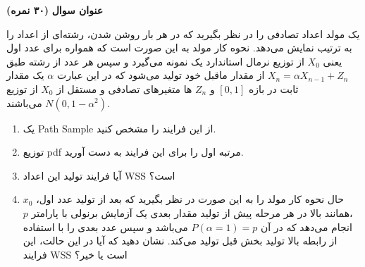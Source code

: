 \Large \textbf{عنوان سوال}
\large \textbf{(۳۰ نمره)}

\normalsize \vspace{0.5cm}

یک مولد اعداد تصادفی را در نظر بگیرید که در هر بار روشن شدن، رشته‌ای از اعداد را به ترتیب نمایش می‌دهد. نحوه کار مولد به این صورت است که همواره برای عدد اول یعنی
${X_0}$
از توزیع نرمال استاندارد یک نمونه می‌گیرد و سپس هر عدد از رشته طبق 
${X_n} = \alpha {X_{n - 1}} + {Z_n}$
از مقدار ماقبل خود تولید می‌شود که در این عبارت
$\alpha$
یک مقدار ثابت در بازه
$\left[ {0,1} \right]$
و
${Z_n}$
ها متغیرهای تصادفی
و مستقل از
${X_0}$
از توزیع
$N\left( {0,1 - {\alpha ^2}} \right)$
می‌باشند.

\begin{enumerate}[label=(\alph*)]
	\item
	یک Path Sample از این فرایند را مشخص کنید.
	\item
	توزیع pdf مرتبه اول را برای این فرایند به دست آورید.
	\item
	آیا فرایند تولید این اعداد WSS است؟
	\item
	حال نحوه کار مولد را به این صورت در نظر بگیرید که بعد از تولید عدد اول،
	${x_0}$
	،همانند بالا در هر مرحله پیش از تولید مقدار بعدی یک آزمایش برنولی با پارامتر
	$p$
	انجام می‌دهد که در آن
	$P\left( {\alpha  = 1} \right) = p$
	می‌باشد و سپس عدد بعدی را با استفاده از رابطه بالا تولید بخش قبل تولید می‌کند. نشان دهید که آیا در این حالت، این فرایند WSS است یا خیر؟
	
\end{enumerate}